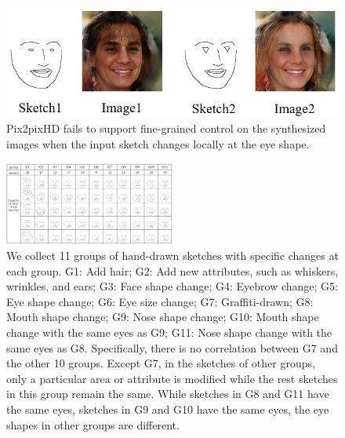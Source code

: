 \documentclass{article}
\begin{document}
\begin{figure}
	\centering
	\includegraphics[width=\columnwidth]{figures/prob-in-pix2pixHD.png}
	\caption{Pix2pixHD fails to support fine-grained control on the synthesized images when the input sketch changes locally at the eye shape.}
	\label{fig:problem-in}
\end{figure}


\begin{figure}[htbp]
	\centering
	\includegraphics[width=0.5\textwidth]{hand_drawn_sketches.png}
	\caption{We collect 11 groups of hand-drawn sketches with specific changes at each group. G1: Add hair; G2: Add new attributes, such as whiskers, wrinkles, and ears; G3: Face shape change; G4: Eyebrow change; G5: Eye shape change; G6: Eye size change; G7: Graffiti-drawn; G8: Mouth shape change; G9: Nose shape change; G10: Mouth shape change with the same eyes as G9; G11: Nose shape change with the same eyes as G8. Specifically, there is no correlation between G7 and the other 10 groups. Except G7, in the sketches of other groups, only a particular area or attribute is modified while the rest sketches in this group remain the same. While sketches in G8 and G11 have the same eyes, sketches in G9 and G10 have the same eyes, the eye shapes in other groups are different.}
	\label{fig:hand_drawn_contours}
\end{figure}
\end{document}

